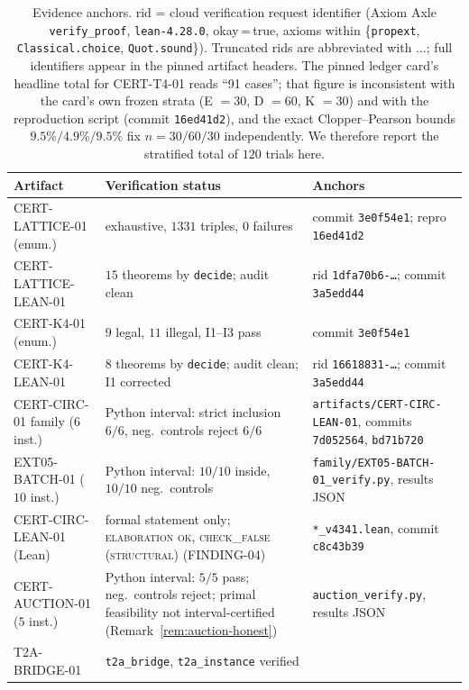 \documentclass[11pt]{article}
\theoremstyle{definition}
\theoremstyle{remark}
\newcommand{\rid}[1]{\texttt{#1}}
\newcommand{\lean}[1]{\texttt{#1}}
\begin{document}
\begin{table}[t]
\centering
\caption{Evidence anchors. rid = cloud verification request identifier
(Axiom Axle \texttt{verify\_proof}, \texttt{lean-4.28.0}, okay\,=\,true,
axioms within \{\texttt{propext}, \texttt{Classical.choice},
\texttt{Quot.sound}\}). Truncated rids are abbreviated with $\ldots$; full
identifiers appear in the pinned artifact headers. The pinned ledger
card's headline total for CERT-T4-01 reads ``91 cases''; that figure is
inconsistent with the card's own frozen strata (E $=30$, D $=60$, K $=30$) and
with the reproduction script (commit \rid{16ed41d2}), and the exact
Clopper--Pearson bounds $9.5\%/4.9\%/9.5\%$ fix $n=30/60/30$ independently.
We therefore report the stratified total of $120$ trials
here.}\label{tab:evidence}
\small
\begin{tabular}{>{\raggedright\arraybackslash}p{4.6cm} >{\raggedright\arraybackslash}p{4.4cm} >{\raggedright\arraybackslash}p{5.2cm}}
\toprule
Artifact & Verification status & Anchors \\
\midrule
CERT-LATTICE-01 (enum.) & exhaustive, $1331$ triples, $0$ failures &
commit \rid{3e0f54e1}; repro \rid{16ed41d2} \\
CERT-LATTICE-LEAN-01 & $15$ theorems by \texttt{decide}; audit clean &
rid \rid{1dfa70b6-\ldots}; commit \rid{3a5edd44} \\
CERT-K4-01 (enum.) & $9$ legal, $11$ illegal, I1--I3 pass &
commit \rid{3e0f54e1} \\
CERT-K4-LEAN-01 & $8$ theorems by \texttt{decide}; audit clean; I1 corrected &
rid \rid{16618831-\ldots}; commit \rid{3a5edd44} \\
CERT-CIRC-01 family ($6$ inst.) & Python interval: strict inclusion $6/6$,
neg.\ controls reject $6/6$ & \lean{artifacts/CERT-CIRC-LEAN-01}, commits
\rid{7d052564}, \rid{bd71b720} \\
EXT05-BATCH-01 ($10$ inst.) & Python interval: $10/10$ inside, $10/10$
neg.\ controls & \lean{family/EXT05-BATCH-01\_verify.py}, results JSON \\
CERT-CIRC-LEAN-01 (Lean) & formal statement only;
\textsc{elaboration ok}, \textsc{check\_false (structural)} (FINDING-04) &
\lean{*\_v4341.lean}, commit \rid{c8c43b39} \\
CERT-AUCTION-01 ($5$ inst.) & Python interval: $5/5$ pass; neg.\ controls
reject; primal feasibility not interval-certified (Remark~\ref{rem:auction-honest}) &
\lean{auction\_verify.py}, results JSON \\
T2A-BRIDGE-01 & \lean{t2a\_bridge}, \lean{t2a\_instance} verified &

\end{tabular}
\end{table}
\end{document}
